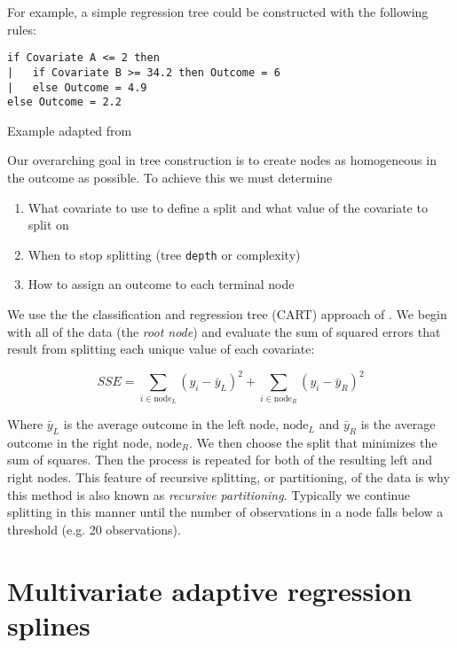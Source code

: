 \documentclass[12pt]{article}
\begin{document}
For example, a simple regression tree could be constructed with the following rules:
\begin{verbatim}
if Covariate A <= 2 then
|   if Covariate B >= 34.2 then Outcome = 6
|   else Outcome = 4.9
else Outcome = 2.2
\end{verbatim}

Example adapted from \cite{kuhn}

Our overarching goal in tree construction is to create nodes as homogeneous in the outcome as possible. To achieve this we must determine

\begin{enumerate}
  \item What covariate to use to define a split and what value of the covariate to split on
  \item When to stop splitting (tree \texttt{depth} or complexity)
  \item How to assign an outcome to each terminal node
\end{enumerate}

We use the the classification and regression tree (CART) approach of \cite{CART}. We begin with all of the data (the \emph{root node}) and evaluate the sum of squared errors that result from splitting each unique value of each covariate:

\[
  SSE = \sum_{i \in \text{node}_{L}} (y_{i} - \bar{y}_{L})^2 + \sum_{i \in \text{node}_{R}} (y_{i} - \bar{y}_{R})^2 
\] 

Where $\bar{y}_{L}$ is the average outcome in the left node, $\text{node}_{L}$ and $\bar{y}_{R}$ is the average outcome in the right node, $\text{node}_{R}$. We then choose the split that minimizes the sum of squares. Then the process is repeated for both of the resulting left and right nodes. This feature of recursive splitting, or partitioning, of the data is why this method is also known as \emph{recursive partitioning}. Typically we continue splitting in this manner until the number of observations in a node falls below a threshold (e.g. 20 observations).









\section{Multivariate adaptive regression splines} %
\label{sec:mars}
\end{document}
